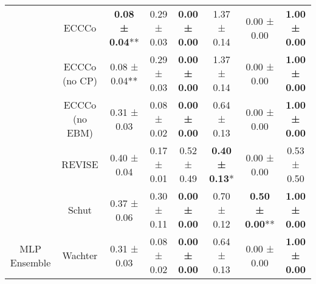 \begin{table}
{\begin{tabular}[t]{cccccccc}
 & ECCCo & \textbf{0.08 ± 0.04}** & 0.29 ± 0.03\hphantom{*}\hphantom{*} & \textbf{0.00 ± 0.00}\hphantom{*}\hphantom{*} & 1.37 ± 0.14\hphantom{*}\hphantom{*} & 0.00 ± 0.00\hphantom{*}\hphantom{*} & \textbf{1.00 ± 0.00}\hphantom{*}\hphantom{*}\\

 & ECCCo (no CP) & 0.08 ± 0.04** & 0.29 ± 0.03\hphantom{*}\hphantom{*} & \textbf{0.00 ± 0.00}\hphantom{*}\hphantom{*} & 1.37 ± 0.14\hphantom{*}\hphantom{*} & 0.00 ± 0.00\hphantom{*}\hphantom{*} & \textbf{1.00 ± 0.00}\hphantom{*}\hphantom{*}\\

 & ECCCo (no EBM) & 0.31 ± 0.03\hphantom{*}\hphantom{*} & 0.08 ± 0.02\hphantom{*}\hphantom{*} & \textbf{0.00 ± 0.00}\hphantom{*}\hphantom{*} & 0.64 ± 0.13\hphantom{*}\hphantom{*} & 0.00 ± 0.00\hphantom{*}\hphantom{*} & \textbf{1.00 ± 0.00}\hphantom{*}\hphantom{*}\\

 & REVISE & 0.40 ± 0.04\hphantom{*}\hphantom{*} & 0.17 ± 0.01\hphantom{*}\hphantom{*} & 0.52 ± 0.49\hphantom{*}\hphantom{*} & \textbf{0.40 ± 0.13}*\hphantom{*} & 0.00 ± 0.00\hphantom{*}\hphantom{*} & 0.53 ± 0.50\hphantom{*}\hphantom{*}\\

 & Schut & 0.37 ± 0.06\hphantom{*}\hphantom{*} & 0.30 ± 0.11\hphantom{*}\hphantom{*} & \textbf{0.00 ± 0.00}\hphantom{*}\hphantom{*} & 0.70 ± 0.12\hphantom{*}\hphantom{*} & \textbf{0.50 ± 0.00}** & \textbf{1.00 ± 0.00}\hphantom{*}\hphantom{*}\\

\multirow[t]{-9}{*}{\centering\arraybackslash MLP Ensemble} & Wachter & 0.31 ± 0.03\hphantom{*}\hphantom{*} & 0.08 ± 0.02\hphantom{*}\hphantom{*} & \textbf{0.00 ± 0.00}\hphantom{*}\hphantom{*} & 0.64 ± 0.13\hphantom{*}\hphantom{*} & 0.00 ± 0.00\hphantom{*}\hphantom{*} & \textbf{1.00 ± 0.00}\hphantom{*}\hphantom{*}\\
\bottomrule
\end{tabular}}
\end{table}
